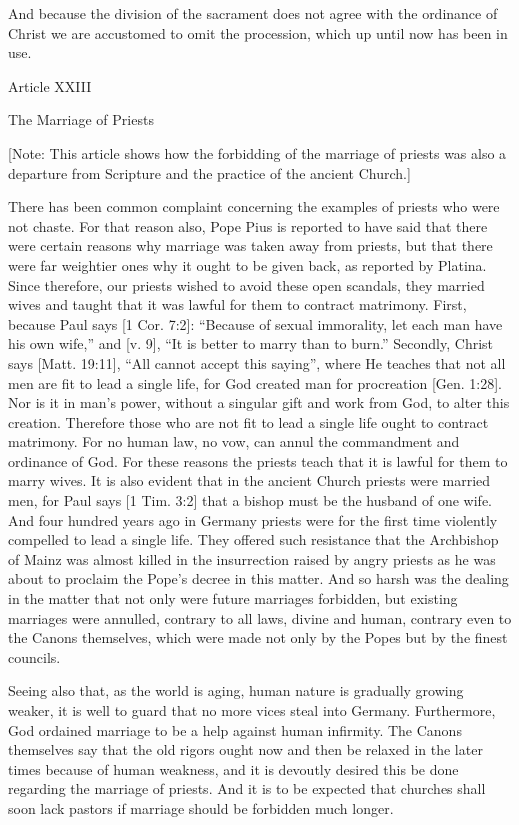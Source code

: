 And because the division of the sacrament does not agree with the ordinance of Christ we are accustomed to omit the procession, which up until now has been in use.

 

Article XXIII

The Marriage of Priests

[Note: This article shows how the forbidding of the marriage of priests was also a departure from Scripture and the practice of the ancient Church.]

There has been common complaint concerning the examples of priests who were not chaste. For that reason also, Pope Pius is reported to have said that there were certain reasons why marriage was taken away from priests, but that there were far weightier ones why it ought to be given back, as reported by Platina. Since therefore, our priests wished to avoid these open scandals, they married wives and taught that it was lawful for them to contract matrimony. First, because Paul says [1 Cor. 7:2]: “Because of sexual immorality, let each man have his own wife,” and [v. 9], “It is better to marry than to burn.” Secondly, Christ says [Matt. 19:11], “All cannot accept this saying”, where He teaches that not all men are fit to lead a single life, for God created man for procreation [Gen. 1:28]. Nor is it in man’s power, without a singular gift and work from God, to alter this creation. Therefore those who are not fit to lead a single life ought to contract matrimony. For no human law, no vow, can annul the commandment and ordinance of God. For these reasons the priests teach that it is lawful for them to marry wives. It is also evident that in the ancient Church priests were married men, for Paul says [1 Tim. 3:2] that a bishop must be the husband of one wife. And four hundred years ago in Germany priests were for the first time violently compelled to lead a single life. They offered such resistance that the Archbishop of Mainz was almost killed in the insurrection raised by angry priests as he was about to proclaim the Pope’s decree in this matter. And so harsh was the dealing in the matter that not only were future marriages forbidden, but existing marriages were annulled, contrary to all laws, divine and human, contrary even to the Canons themselves, which were made not only by the Popes but by the finest councils.

Seeing also that, as the world is aging, human nature is gradually growing weaker, it is well to guard that no more vices steal into Germany. Furthermore, God ordained marriage to be a help against human infirmity. The Canons themselves say that the old rigors ought now and then be relaxed in the later times because of human weakness, and it is devoutly desired this be done regarding the marriage of priests. And it is to be expected that churches shall soon lack pastors if marriage should be forbidden much longer.

